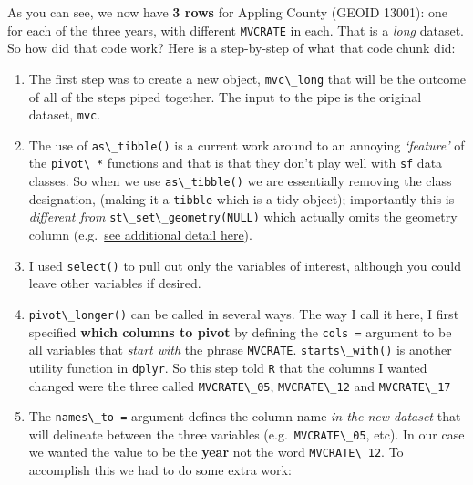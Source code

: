 \documentclass[
]{book}
\newcommand{\passthrough}[1]{#1}
\providecommand{\tightlist}{%
  \setlength{\itemsep}{0pt}\setlength{\parskip}{0pt}}
\begin{document}
As you can see, we now have \textbf{3 rows} for Appling County (GEOID 13001): one for each of the three years, with different \passthrough{\lstinline!MVCRATE!} in each. That is a \emph{long} dataset. So how did that code work? Here is a step-by-step of what that code chunk did:

\begin{enumerate}
\def\labelenumi{\arabic{enumi}.}
\tightlist
\item
  The first step was to create a new object, \passthrough{\lstinline!mvc\_long!} that will be the outcome of all of the steps piped together. The input to the pipe is the original dataset, \passthrough{\lstinline!mvc!}.
\item
  The use of \passthrough{\lstinline!as\_tibble()!} is a current work around to an annoying \emph{`feature'} of the \passthrough{\lstinline!pivot\_*!} functions and that is that they don't play well with \passthrough{\lstinline!sf!} data classes. So when we use \passthrough{\lstinline!as\_tibble()!} we are essentially removing the class designation, (making it a \passthrough{\lstinline!tibble!} which is a tidy object); importantly this is \emph{different from} \passthrough{\lstinline!st\_set\_geometry(NULL)!} which actually omits the geometry column (e.g.~\protect\hyperlink{sf_overview}{see additional detail here}).
\item
  I used \passthrough{\lstinline!select()!} to pull out only the variables of interest, although you could leave other variables if desired.
\item
  \passthrough{\lstinline!pivot\_longer()!} can be called in several ways. The way I call it here, I first specified \textbf{which columns to pivot} by defining the \passthrough{\lstinline!cols =!} argument to be all variables that \emph{start with} the phrase \passthrough{\lstinline!MVCRATE!}. \passthrough{\lstinline!starts\_with()!} is another utility function in \passthrough{\lstinline!dplyr!}. So this step told \passthrough{\lstinline!R!} that the columns I wanted changed were the three called \passthrough{\lstinline!MVCRATE\_05!}, \passthrough{\lstinline!MVCRATE\_12!} and \passthrough{\lstinline!MVCRATE\_17!}
\item
  The \passthrough{\lstinline!names\_to =!} argument defines the column name \emph{in the new dataset} that will delineate between the three variables (e.g.~\passthrough{\lstinline!MVCRATE\_05!}, etc). In our case we wanted the value to be the \textbf{year} not the word \passthrough{\lstinline!MVCRATE\_12!}. To accomplish this we had to do some extra work:
\end{enumerate}
\end{document}

